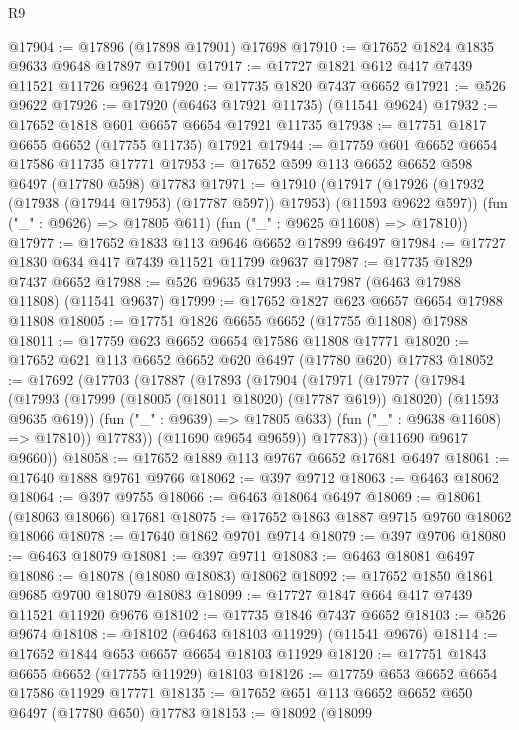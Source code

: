 \begin{lexlean}{R9}
\begin{coremodule}
{{{{{{{{{{{{{{{{{{{{{{{{{{{{{{{{{{{{{{{{{{{{{{{{{{{{{{{{{{{{{{{{{{{{{{{{{{{{{{{{{{{{@17904 := @17896 (@17898 @17901) @17698
@17910 := @17652 @1824 @1835 @9633 @9648 @17897 @17901
@17917 := @17727 @1821 @612 @417 @7439 @11521 @11726 @9624
@17920 := @17735 @1820 @7437 @6652
@17921 := @526 @9622
@17926 := @17920 (@6463 @17921 @11735) (@11541 @9624)
@17932 := @17652 @1818 @601 @6657 @6654 @17921 @11735
@17938 := @17751 @1817 @6655 @6652 (@17755 @11735) @17921
@17944 := @17759 @601 @6652 @6654 @17586 @11735 @17771
@17953 := @17652 @599 @113 @6652 @6652 @598 @6497 (@17780 @598) @17783
@17971 := @17910
    (@17917
      (@17926 (@17932 (@17938 (@17944 @17953) (@17787 @597)) @17953) (@11593 @9622 @597))
      (fun ("_" : @9626) => @17805 @611)
      (fun ("_" : @9625 @11608) => @17810))
@17977 := @17652 @1833 @113 @9646 @6652 @17899 @6497
@17984 := @17727 @1830 @634 @417 @7439 @11521 @11799 @9637
@17987 := @17735 @1829 @7437 @6652
@17988 := @526 @9635
@17993 := @17987 (@6463 @17988 @11808) (@11541 @9637)
@17999 := @17652 @1827 @623 @6657 @6654 @17988 @11808
@18005 := @17751 @1826 @6655 @6652 (@17755 @11808) @17988
@18011 := @17759 @623 @6652 @6654 @17586 @11808 @17771
@18020 := @17652 @621 @113 @6652 @6652 @620 @6497 (@17780 @620) @17783
@18052 := @17692
    (@17703
      (@17887
        (@17893
          (@17904
            (@17971
              (@17977
                (@17984
                  (@17993
                    (@17999 (@18005 (@18011 @18020) (@17787 @619)) @18020)
                    (@11593 @9635 @619))
                  (fun ("_" : @9639) => @17805 @633)
                  (fun ("_" : @9638 @11608) => @17810))
                @17783))
            (@11690 @9654 @9659))
          @17783))
      (@11690 @9617 @9660))
@18058 := @17652 @1889 @113 @9767 @6652 @17681 @6497
@18061 := @17640 @1888 @9761 @9766
@18062 := @397 @9712
@18063 := @6463 @18062
@18064 := @397 @9755
@18066 := @6463 @18064 @6497
@18069 := @18061 (@18063 @18066) @17681
@18075 := @17652 @1863 @1887 @9715 @9760 @18062 @18066
@18078 := @17640 @1862 @9701 @9714
@18079 := @397 @9706
@18080 := @6463 @18079
@18081 := @397 @9711
@18083 := @6463 @18081 @6497
@18086 := @18078 (@18080 @18083) @18062
@18092 := @17652 @1850 @1861 @9685 @9700 @18079 @18083
@18099 := @17727 @1847 @664 @417 @7439 @11521 @11920 @9676
@18102 := @17735 @1846 @7437 @6652
@18103 := @526 @9674
@18108 := @18102 (@6463 @18103 @11929) (@11541 @9676)
@18114 := @17652 @1844 @653 @6657 @6654 @18103 @11929
@18120 := @17751 @1843 @6655 @6652 (@17755 @11929) @18103
@18126 := @17759 @653 @6652 @6654 @17586 @11929 @17771
@18135 := @17652 @651 @113 @6652 @6652 @650 @6497 (@17780 @650) @17783
@18153 := @18092
    (@18099
}}}}}}}}}}}}}}}}}}}}}}}}}}}}}}}}}}}}}}}}}}}}}}}}}}}}}}}}}}}}}}}}}}}}}}}}}}}}}}}}}}}}
\end{coremodule}
\end{lexlean}
